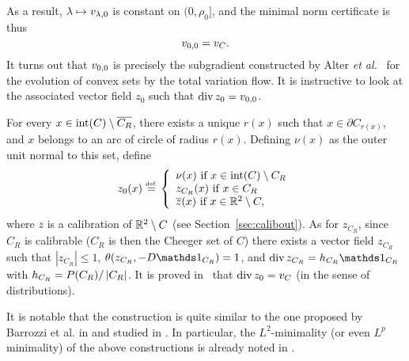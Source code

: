As a result, $\lambda \mapsto v_{\lambda,0}$ is constant on $(0,\rho_0]$, and the minimal norm certificate is thus
\begin{equation}\label{eq:convexmincertif}
  v_{0,0} = v_C.
\end{equation}
It turns out that $v_{0,0}$ is precisely the subgradient constructed by Alter \textit{et al.}~\cite{alterconvex05} for the evolution of convex sets by the total variation flow. It is instructive to look at the associated vector field $z_0$ such that $\operatorname{div} z_0=v_{0,0}$.

For every $x\in \operatorname{int}(C)\setminus\overline{C_R}$, there exists a unique $r(x)$ such that $x\in \partial C_{r(x)}$, and $x$ belongs to an arc of circle of radius $r(x)$. Defining $\nu(x)$ as the outer unit normal to this set, 
 define 
\begin{align*}
  z_0(x)\stackrel{\mbox{\upshape\tiny def.}}{=}\left\{ \begin{array}{l}\nu(x) \mbox{ if }x\in \operatorname{int}(C)\setminus C_R\\ 
      z_{C_R}(x) \mbox{ if } x\in C_R\\
    \overline{z}(x) \mbox{ if } x\in \mathbb{R}^2\setminus C, 
  \end{array} \right.
\end{align*}
where $\overline{z}$ is a calibration of $\mathbb{R}^2\setminus C$ (see Section~\ref{sec:calibout}). As for $z_{C_R}$, since $C_R$ is calibrable ($C_R$ is then the Cheeger set of $C$) there exists a vector field $z_{C_R}$ such that $|z_{C_R}|\leq 1$, $\theta(z_{C_R},-D\bun{C_R})=1$, and $\divx z_{C_R}=h_{C_R} \bun{C_R}$ with $h_{C_R}=P(C_R)/\left| C_R \right|$. It is proved in~\cite{alterconvex05} that $\operatorname{div} z_0=v_C$ (in the sense of distributions).

It is notable that the construction is quite similar to the one proposed by Barrozzi et al. in \cite{Barozzi} and studied in \cite{massari1994variational}. In particular, the $L^2$-minimality (or even $L^p$ minimality) of the above constructions is already noted in  \cite{massari1994variational}.
